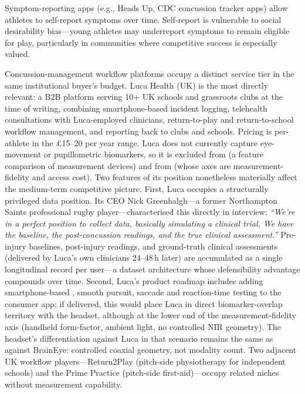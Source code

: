 Symptom-reporting apps (e.g., Heads Up, CDC concussion tracker apps) allow athletes to self-report symptoms over time. Self-report is vulnerable to social desirability bias---young athletes may underreport symptoms to remain eligible for play, particularly in communities where competitive success is especially valued.

Concussion-management workflow platforms occupy a distinct service tier in the same institutional buyer's budget. Luca Health (UK) is the most directly relevant: a B2B platform serving 10+ UK schools and grassroots clubs at the time of writing, combining smartphone-based incident logging, telehealth consultations with Luca-employed clinicians, return-to-play and return-to-school workflow management, and reporting back to clubs and schools. Pricing is per-athlete in the \pounds 15--20 per year range. Luca does not currently capture eye-movement or pupillometric biomarkers, so it is excluded from  (a feature comparison of measurement devices) and from  (whose axes are measurement-fidelity and access cost). Two features of its position nonetheless materially affect the medium-term competitive picture. First, Luca occupies a structurally privileged data position. Its CEO Nick Greenhalgh---a former Northampton Saints professional rugby player---characterised this directly in interview: \textit{``We're in a perfect position to collect data, basically simulating a clinical trial. We have the baseline, the post-concussion readings, and the true clinical assessment.''} Pre-injury baselines, post-injury readings, and ground-truth clinical assessments (delivered by Luca's own clinicians 24--48\,h later) are accumulated as a single longitudinal record per user---a dataset architecture whose defensibility advantage compounds over time. Second, Luca's product roadmap includes adding smartphone-based , smooth pursuit, saccade and reaction-time testing to the consumer app; if delivered, this would place Luca in direct biomarker-overlap territory with the headset, although at the lower end of the measurement-fidelity axis (handheld form-factor, ambient light, no controlled NIR geometry). The headset's differentiation against Luca in that scenario remains the same as against BrainEye: controlled coaxial geometry, not modality count. Two adjacent UK workflow players---Return2Play (pitch-side physiotherapy for independent schools) and the Prime Practice (pitch-side first-aid)---occupy related niches without measurement capability.

